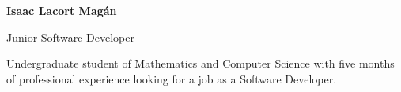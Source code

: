 \documentclass{article}
\begin{document}
\thispagestyle{empty} 
\begin{minipage}{0.4\linewidth}
\textbf{\huge{Isaac Lacort Magán}}

\large{\color{BlueViolet}Junior Software Developer}
\end{minipage}
\hspace{1cm}
\begin{minipage}{0.5\linewidth}
  \vspace{0.2cm}
\begin{center}
  \large Undergraduate student of Mathematics and Computer Science with five months of professional experience looking for a job as a Software Developer.
\end{center}
\end{minipage}
\vspace{0.4cm}
\end{document}
